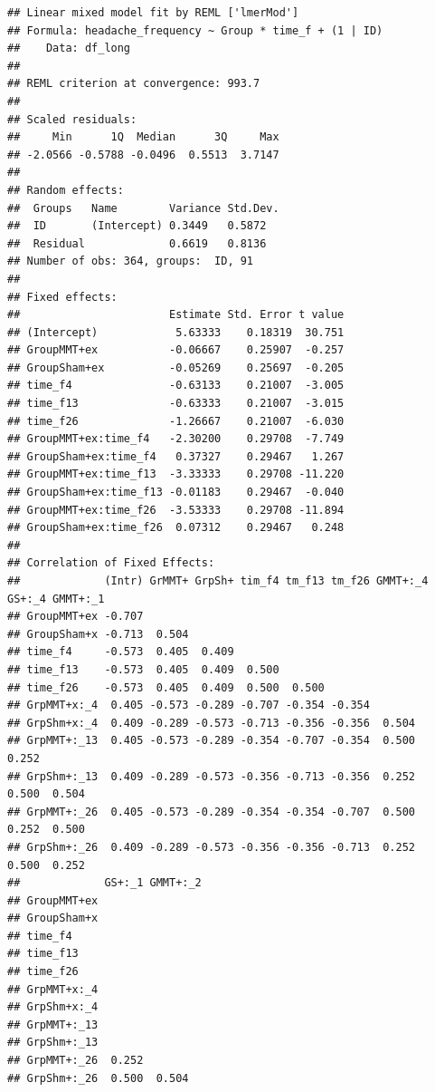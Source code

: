 \documentclass[
]{book}
\begin{document}
\begin{verbatim}
## Linear mixed model fit by REML ['lmerMod']
## Formula: headache_frequency ~ Group * time_f + (1 | ID)
##    Data: df_long
## 
## REML criterion at convergence: 993.7
## 
## Scaled residuals: 
##     Min      1Q  Median      3Q     Max 
## -2.0566 -0.5788 -0.0496  0.5513  3.7147 
## 
## Random effects:
##  Groups   Name        Variance Std.Dev.
##  ID       (Intercept) 0.3449   0.5872  
##  Residual             0.6619   0.8136  
## Number of obs: 364, groups:  ID, 91
## 
## Fixed effects:
##                       Estimate Std. Error t value
## (Intercept)            5.63333    0.18319  30.751
## GroupMMT+ex           -0.06667    0.25907  -0.257
## GroupSham+ex          -0.05269    0.25697  -0.205
## time_f4               -0.63133    0.21007  -3.005
## time_f13              -0.63333    0.21007  -3.015
## time_f26              -1.26667    0.21007  -6.030
## GroupMMT+ex:time_f4   -2.30200    0.29708  -7.749
## GroupSham+ex:time_f4   0.37327    0.29467   1.267
## GroupMMT+ex:time_f13  -3.33333    0.29708 -11.220
## GroupSham+ex:time_f13 -0.01183    0.29467  -0.040
## GroupMMT+ex:time_f26  -3.53333    0.29708 -11.894
## GroupSham+ex:time_f26  0.07312    0.29467   0.248
## 
## Correlation of Fixed Effects:
##             (Intr) GrMMT+ GrpSh+ tim_f4 tm_f13 tm_f26 GMMT+:_4 GS+:_4 GMMT+:_1
## GroupMMT+ex -0.707                                                            
## GroupSham+x -0.713  0.504                                                     
## time_f4     -0.573  0.405  0.409                                              
## time_f13    -0.573  0.405  0.409  0.500                                       
## time_f26    -0.573  0.405  0.409  0.500  0.500                                
## GrpMMT+x:_4  0.405 -0.573 -0.289 -0.707 -0.354 -0.354                         
## GrpShm+x:_4  0.409 -0.289 -0.573 -0.713 -0.356 -0.356  0.504                  
## GrpMMT+:_13  0.405 -0.573 -0.289 -0.354 -0.707 -0.354  0.500    0.252         
## GrpShm+:_13  0.409 -0.289 -0.573 -0.356 -0.713 -0.356  0.252    0.500  0.504  
## GrpMMT+:_26  0.405 -0.573 -0.289 -0.354 -0.354 -0.707  0.500    0.252  0.500  
## GrpShm+:_26  0.409 -0.289 -0.573 -0.356 -0.356 -0.713  0.252    0.500  0.252  
##             GS+:_1 GMMT+:_2
## GroupMMT+ex                
## GroupSham+x                
## time_f4                    
## time_f13                   
## time_f26                   
## GrpMMT+x:_4                
## GrpShm+x:_4                
## GrpMMT+:_13                
## GrpShm+:_13                
## GrpMMT+:_26  0.252         
## GrpShm+:_26  0.500  0.504
\end{verbatim}
\end{document}
